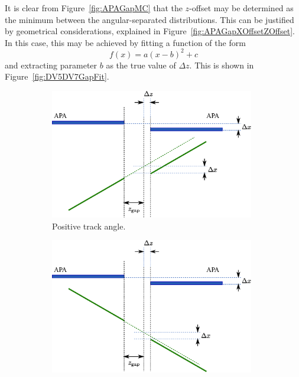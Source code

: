 It is clear from Figure~\ref{fig:APAGapMC} that the $z$-offset may be determined as the minimum between the angular-separated distributions.  This can be justified by geometrical considerations, explained in Figure~\ref{fig:APAGapXOffsetZOffset}.  In this case, this may be achieved by fitting a function of the form
\begin{equation}
  f(x) = a(x-b)^2+c
\end{equation}
and extracting parameter $b$ as the true value of $\Delta z$.  This is shown in Figure~\ref{fig:DV5DV7GapFit}.

\begin{figure}
  \centering
  \begin{subfigure}[t]{0.48\linewidth}
    \centering
    \includegraphics[width=0.98\textwidth]{apa_gap_xoffset_zoffset_pos.eps}
    \caption{Positive track angle.}
    \label{fig:APAGapXOffsetZOffsetPos}
  \end{subfigure}
  \hfill
  \begin{subfigure}[t]{0.48\linewidth}
    \centering
    \includegraphics[width=0.98\textwidth]{apa_gap_xoffset_zoffset_neg.eps}

\end{subfigure}
\end{figure}

